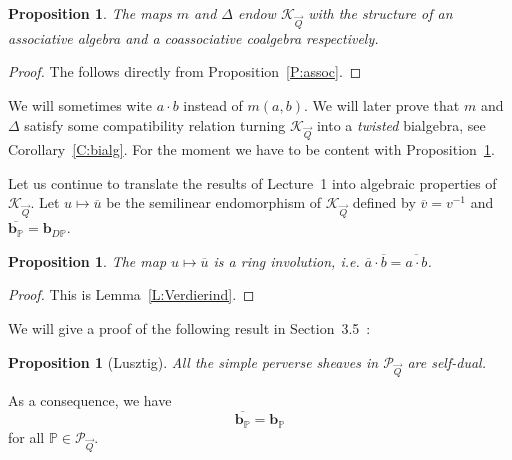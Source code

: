 \documentclass[a4paper,10pt]{amsart}
\def\PQ{\mathcal{P}_{\vec{Q}}}
\newtheorem{prop}[theo]{Proposition}
\numberwithin{equation}{section}
\begin{document}
\vspace{.1in}

\begin{prop}\label{P:assoc2} The maps $m$ and $\Delta$ endow $\mathcal{K}_{\vec{Q}}$ with the structure of an associative algebra and a coassociative coalgebra respectively.
\end{prop}
\begin{proof} The follows directly from Proposition~\ref{P:assoc}.\end{proof}

\vspace{.1in}

We will sometimes wite $a \cdot b$ instead of $m(a,b)$. We will later prove that $m$ and $\Delta$ satisfy some compatibility relation turning $\mathcal{K}_{\vec{Q}}$ into a \textit{twisted} bialgebra, see Corollary~\ref{C:bialg}. For the moment we have to be content with Proposition~\ref{P:assoc2}. 

\vspace{.1in}

Let us continue to translate the results of Lecture~1 into algebraic properties of $\mathcal{K}_{\vec{Q}}$. Let $u \mapsto \overline{u}$ be the semilinear endomorphism of $\mathcal{K}_{\vec{Q}}$ defined by $\overline{v}=v^{-1}$ and
$\overline{\mathbf{b}_{\mathbb{P}}}=\mathbf{b}_{D\mathbb{P}}.$

\vspace{.1in}

\begin{prop}\label{P:Verdier} The map $u \mapsto \overline{u}$ is a ring involution, i.e. $\overline{a} \cdot \overline{b}=\overline{a \cdot b}$.
\end{prop}
\begin{proof} This is Lemma~\ref{L:Verdierind}.\end{proof}

\vspace{.1in}

We will give a proof of the following result in Section~3.5~:

\vspace{.1in}

\begin{prop}[Lusztig]\label{P:LU} All the simple perverse sheaves in $\PQ$ are self-dual.
\end{prop}

As a consequence, we have 
\begin{equation}\label{E:selfdual}
\overline{\mathbf{b}_{\mathbb{P}}}=\mathbf{b}_{\mathbb{P}}
\end{equation}
for all $\mathbb{P} \in \PQ$.
\end{document}
